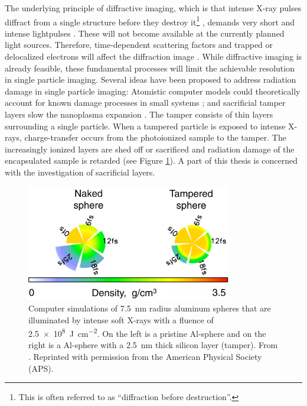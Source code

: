 The underlying principle of diffractive imaging, which is that intense X-ray pulses diffract from a single structure before they destroy it\footnote{This is often referred to as ``diffraction before destruction''.} \cite{Neutze-2000-Nature}, demands very short and intense lightpulses \cite{Huldt-2003-JSB,Hau-Riege-2005-PRE}. These will not become available at the currently planned light sources. Therefore, time-dependent scattering factors and trapped or delocalized electrons will affect the diffraction image \cite{Aquila-2015-StrucDyn}. While diffractive imaging is already feasible, these fundamental processes will limit the achievable resolution in single particle imaging. Several ideas have been proposed to address radiation damage in single particle imaging: Atomistic computer models could theoretically account for known damage processes in small systems \citep{Ho-2016-PRA,Quiney-2010-NatPhys,Yoon-2016-scirep}; and sacrificial tamper layers slow the nanoplasma expansion \cite{Hau-Riege-2004-PRE,Hau-Riege-2007-PRL,Jurek-2008-EPJ,Jurek-2009-EPL,Hau-Riege-2010-PRL,Hoener-2008-JPB}. The tamper consists of thin layers surrounding a single particle. When a tampered particle is exposed to intense X-rays, charge-transfer occurs from the photoionized sample to the tamper. The increasingly ionized layers are shed off or sacrificed and radiation damage of the encapsulated sample is retarded (see Figure \ref{fig:tamper-layer}). A part of this thesis is concerned with the investigation of sacrificial layers.\\[1\baselineskip]
%
\begin{figure}
	\centering
		\includegraphics[width=0.80\textwidth]{images/tamper-layer.png}
	\caption[Computer simulations of aluminum spheres with tamper layers]{Computer simulations of \SI{7.5}{\nano\meter} radius aluminum spheres that are illuminated by intense soft X-rays with a fluence of \SI{2.5e8}{\joule\per\square\centi\meter}. On the left is a pristine Al-sphere and on the right is a Al-sphere with a \SI{2.5}{\nano\meter} thick silicon layer (tamper). From \citep{Hau-Riege-2010-PRL}. Reprinted with permission from the American Physical Society (APS).}
	\label{fig:tamper-layer}
\end{figure}
